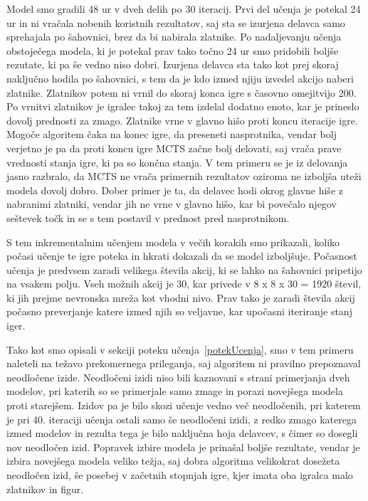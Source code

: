 \documentclass[a4paper, 12pt]{book}
\begin{document}
Model smo gradili 48 ur v dveh delih po 30 iteracij.
Prvi del učenja je potekal 24 ur in ni vračala nobenih koristnih rezultatov, saj sta se izurjena delavca samo sprehajala po šahovnici, brez da bi nabirala zlatnike.
Po nadaljevanju učenja obstoječega modela, ki je potekal prav tako točno 24 ur smo pridobili boljše rezutate, ki pa še vedno niso dobri.
Izurjena delavca sta tako kot prej skoraj naključno hodila po šahovnici, s tem da je kdo izmed njiju izvedel akcijo naberi zlatnike.
Zlatnikov potem ni vrnil do skoraj konca igre s časovno omejitvijo 200. Po vrnitvi zlatnikov je igralec takoj za tem izdelal dodatno enoto, kar je prineslo dovolj prednosti za zmago.
Zlatnike vrne v glavno hišo proti koncu iteracije igre. Mogoče algoritem čaka na konec igre, da preseneti nasprotnika, vendar bolj verjetno je pa da proti koncu igre MCTS začne bolj delovati, saj vrača prave vrednosti stanja igre, ki pa so končna stanja.
V tem primeru se je iz delovanja jasno razbralo, da MCTS ne vrača primernih rezultatov oziroma ne izboljša uteži modela dovolj dobro.
Dober primer je ta, da delavec hodi okrog glavne hiše z nabranimi zlatniki, vendar jih ne vrne v glavno hišo, kar bi povečalo njegov seštevek točk in se s tem postavil v prednost pred nasprotnikom.

S tem inkrementalnim učenjem modela v večih korakih smo prikazali, koliko počasi učenje te igre poteka in hkrati dokazali da se model izboljšuje.
Počasnost učenja je predvsem zaradi velikega števila akcij, ki se lahko na šahovnici pripetijo na vsakem polju.
Vseh možnih akcij je 30, kar privede v 8 x 8 x 30 = 1920 števil, ki jih prejme nevronska mreža kot vhodni nivo.
Prav tako je zaradi števila akcij počasno preverjanje katere izmed njih so veljavne, kar upočasni iteriranje stanj iger.

Tako kot smo opisali v sekciji poteku učenja~\ref{potekUcenja}, smo v tem primeru naleteli na težavo prekomernega prileganja, saj algoritem ni pravilno prepoznaval neodločene izide.
Neodločeni izidi niso bili kaznovani s strani primerjanja dveh modelov, pri katerih so se primerjale samo zmage in porazi novejšega modela proti starejšem.
Izidov pa je bilo skozi učenje vedno več neodločenih, pri katerem je pri 40. iteraciji učenja ostali samo še neodločeni izidi, z redko zmago katerega izmed modelov in rezulta tega je bilo naključna hoja delavcev, s čimer so dosegli nov neodločen izid.
Popravek izbire modela je prinašal boljše rezultate, vendar je izbira novejšega modela veliko težja, saj dobra algoritma velikokrat dosežeta neodločen izid, še posebej v začetnih stopnjah igre, kjer imata oba igralca malo zlatnikov in figur.
\end{document}
